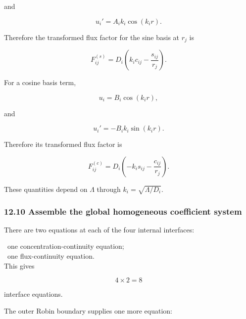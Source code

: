 \documentclass[11pt,a4paper]{article}
\begin{document}
and

\begin{equation}
u_i'=A_ik_i\cos(k_ir).
\tag{TRISO-ML-459}
\label{eq:triso-ml-459}
\end{equation}

Therefore the transformed flux factor for the sine basis at $r_j$ is

\begin{equation}
F^{(s)}_{ij}
=
D_i
\left(
k_ic_{ij}-\frac{s_{ij}}{r_j}
\right).
\tag{TRISO-ML-460}
\label{eq:triso-ml-460}
\end{equation}

For a cosine basis term,

\begin{equation}
u_i=B_i\cos(k_ir),
\tag{TRISO-ML-461}
\label{eq:triso-ml-461}
\end{equation}

and

\begin{equation}
u_i'=-B_ik_i\sin(k_ir).
\tag{TRISO-ML-462}
\label{eq:triso-ml-462}
\end{equation}

Therefore its transformed flux factor is

\begin{equation}
F^{(c)}_{ij}
=
D_i
\left(
-k_is_{ij}-\frac{c_{ij}}{r_j}
\right).
\tag{TRISO-ML-463}
\label{eq:triso-ml-463}
\end{equation}

These quantities depend on $\Lambda$ through $k_i=\sqrt{\Lambda/D_i}$.

\subsubsection*{12.10 Assemble the global homogeneous coefficient system}

There are two equations at each of the four internal interfaces:

\noindent\textbullet\ one concentration-continuity equation;\\
\noindent\textbullet\ one flux-continuity equation.\\

This gives

\begin{equation}
4\times2=8
\tag{TRISO-ML-464}
\label{eq:triso-ml-464}
\end{equation}

interface equations.

The outer Robin boundary supplies one more equation:
\end{document}
